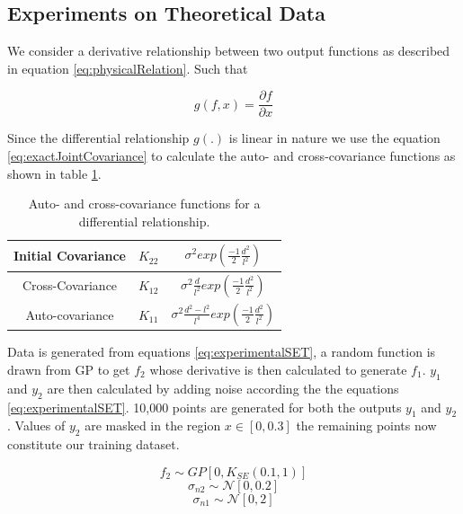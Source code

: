 \subsection{Experiments on Theoretical Data}\label{sub:experimentsSyntheticData}
We consider a derivative relationship between two output functions as described in equation \ref{eq:physicalRelation}. Such that 

\begin{equation*}\label{eq:derivativeEquation}
   g(f, x) = \frac{\partial f}{\partial x} 
\end{equation*}

Since the differential relationship \(g(.)\) is linear in nature we use the equation \ref{eq:exactJointCovariance} to calculate the auto- and cross-covariance functions as shown in table \ref{tab:differentialCovariances}.

\begin{table}[h]
\renewcommand{\arraystretch}{1.5}
\caption{Auto- and cross-covariance functions for a differential relationship.}\label{tab:differentialCovariances} \centering
\begin{tabular}{|c|c|c|}
  \hline
  Initial Covariance & \(K_{22}\) & \(\sigma ^{2}exp(\frac{-1}{2}\frac{d^{2}}{l^{2}})\) \\
  \hline
  Cross-Covariance & \(K_{12}\) &  \(\sigma ^{2}\frac{d}{l^{2}}exp(\frac{-1}{2}\frac{d^{2}}{l^{2}})\) \\
  \hline
  Auto-covariance & \(K_{11}\) & \(\sigma ^{2}\frac{d^{2}-l^{2}}{l^{4}}exp(\frac{-1}{2}\frac{d^{2}}{l^{2}})\) \\
  \hline
\end{tabular}
\end{table}

Data is generated from equations \ref{eq:experimentalSET}, a random function is drawn from GP to get \(f_{2}\) whose derivative is then calculated to generate \(f_{1}\). \(y_{1}\) and \(y_{2}\) are then calculated by adding noise according the the equations \ref{eq:experimentalSET}. 10,000 points are generated for both the outputs \(y_{1}\) and \(y_{2}\). Values of \(y_{2}\) are masked in the region \(x \in [0, 0.3]\) the remaining points now constitute our training dataset. 

\begin{equation*}
f_{2} \sim  GP[0, K_{SE}(0.1, 1)]
\end{equation*}
\begin{equation*}
\sigma_{n2} \sim \mathcal{N}[0, 0.2]
\end{equation*}
\begin{equation}\label{eq:experimentalSET}
\sigma_{n1} \sim \mathcal{N}[0, 2]
\end{equation}

